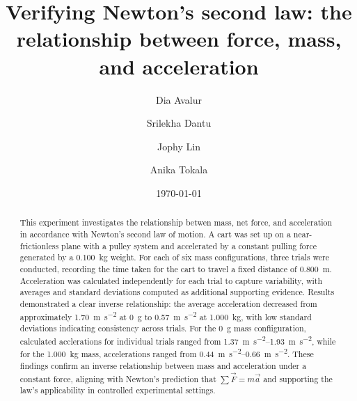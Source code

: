 ﻿\documentclass[reprint,amsmath,amssymb,aps]{revtex4-2}
\begin{document}
\title{Verifying Newton's second law: the relationship between force, mass, and acceleration}
\author{Dia Avalur}
\author{Srilekha Dantu}
\author{Jophy Lin}
\author{Anika Tokala}
\date{\today}

\begin{abstract}
This experiment investigates the relationship betwen mass, net force, and acceleration in accordance with Newton's second law of motion. A cart was set up on a near-frictionless plane with a pulley system and accelerated by a constant pulling force generated by a \qty{0.100}{\kilo\gram} weight. For each of six mass configurations, three trials were conducted, recording the time taken for the cart to travel a fixed distance of \qty{0.800}{\meter}. Acceleration was calculated independently for each trial to capture variability, with averages and standard deviations computed as additional supporting evidence. Results demonstrated a clear inverse relationship: the average acceleration decreased from approximately \qty{1.70}{\meter\per\second\squared} at \qty{0}{\gram} to \qty{0.57}{\meter\per\second\squared} at \qty{1.000}{\kilo\gram}, with low standard deviations indicating consistency across trials. For the \qty{0}{\gram} mass confiiguration, calculated acclerations for individual trials ranged from \qtyrange{1.37}{1.93}{\meter\per\second\squared}, while for the \qty{1.000}{\kilo\gram} mass, accelerations ranged from \qtyrange{0.44}{0.66}{\meter\per\second\squared}. These findings confirm an inverse relationship between mass and acceleration under a constant force, aligning with Newton's prediction that $\sum \vec{F} = m\vec{a}$ and supporting the law's applicability in controlled experimental settings.
\end{abstract}


\maketitle
\end{document}
